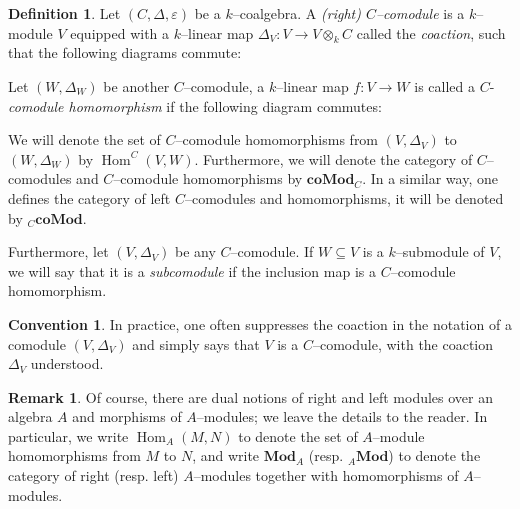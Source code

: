 \documentclass{article}
\theoremstyle{plain}
\theoremstyle{definition}
\newtheorem{Def}[Th]{Definition}
\newtheorem{Rem}[Th]{Remark}
\newtheorem{convention}[Th]{Convention}
\DeclareMathOperator{\id}{id}
\DeclareMathOperator{\Hom}{Hom}
\begin{document}
\begin{Def}
    Let $(C, \Delta, \varepsilon)$ be a $k$--coalgebra. A \textit{(right) $C$--comodule} is a $k$--module $V$ equipped with a $k$--linear map $\Delta_V\colon  V\to V\otimes_k C$ called the \textit{coaction}, such that the following diagrams commute:
    \begin{center}
    \end{center}

    Let $(W, \Delta_W)$ be another $C$--comodule, a $k$--linear map $f\colon V\to W$ is called a $C$-\textit{comodule homomorphism} if the following diagram commutes:
    \begin{center}
    \end{center}

We will denote the set of $C$--comodule homomorphisms from $(V, \Delta_V)$ to $(W, \Delta_W)$ by $\Hom^C(V, W)$. Furthermore, we will denote the category of $C$--comodules and $C$--comodule homomorphisms by $\textbf{coMod}_C$. In a similar way, one defines the category of left $C$--comodules and homomorphisms, it will be denoted by  ${}_{C}\textbf{coMod}$. 

Furthermore, let $(V, \Delta_V)$ be any $C$--comodule. If $W\subseteq V$ is a $k$--submodule of $V$, we will say that it is a \textit{subcomodule} if the inclusion map is a $C$--comodule homomorphism. 
\end{Def}

\begin{convention}
   In practice, one often suppresses the coaction in the notation of a comodule $(V, \Delta_V)$ and simply says that $V$ is a $C$--comodule, with the coaction $\Delta_V$ understood.
\end{convention}

\begin{Rem}
   Of course, there are dual notions of right and left modules over an algebra $A$ and morphisms of $A$--modules; we leave the details to the reader. In particular, we write $\Hom_A(M, N)$ to denote the set of $A$--module homomorphisms from $M$ to $N$, and write $\mathbf{Mod}_A$  (resp. ${}_A\mathbf{Mod}$) to denote the category of right (resp. left)   $A$--modules   together with homomorphisms of $A$--modules.
\end{Rem}
\end{document}
